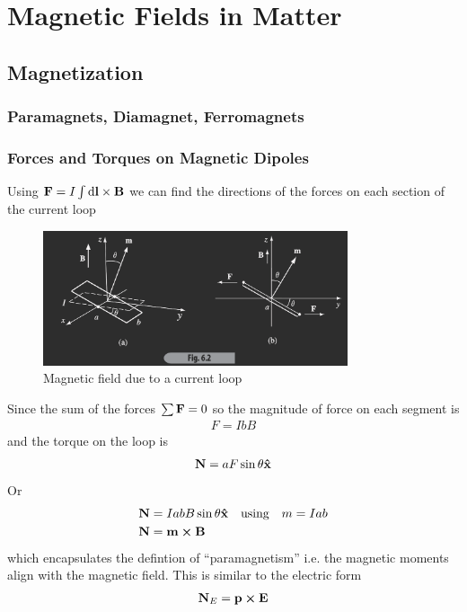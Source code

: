 \documentclass[../main.tex]{subfiles}
\begin{document}
\pagestyle{fancy}

\section{Magnetic Fields in Matter}
\barh \vspace{1em}

\subsection{Magnetization}

\subsubsection{Paramagnets, Diamagnet, Ferromagnets}

\subsubsection{Forces and Torques on Magnetic Dipoles}
Using $\vb F = I \int \dd{\vb l} \times \vb B$ we can find the directions of the forces on each section
of the current loop

\begin{figure}[ht]
    \centering
    \includegraphics[width=0.8\textwidth]{fig6_2.png}
    \caption{Magnetic field due to a current loop}
    \label{fig:gr6_2}
\end{figure}

Since the sum of the forces $\sum \vb F = 0$ so the magnitude of force on each segment is
\begin{align*}
    F = I b B
\end{align*}
and the torque on the loop is
\begin{align*}
    \vb N = a F \sin\theta \vu{x}
\end{align*}
Or
\begin{align*}
    \vb N &= I a b B \sin\theta \vu{x} \qusing m = I a b \\
    \vb N &= \vb m \cross \vb B
\end{align*}
which encapsulates the defintion of ``paramagnetism'' i.e. the magnetic moments align with the magnetic field.
This is similar to the electric form
\begin{align*}
    \vb N_E = \vb p \cross \vb E
\end{align*}
\end{document}
